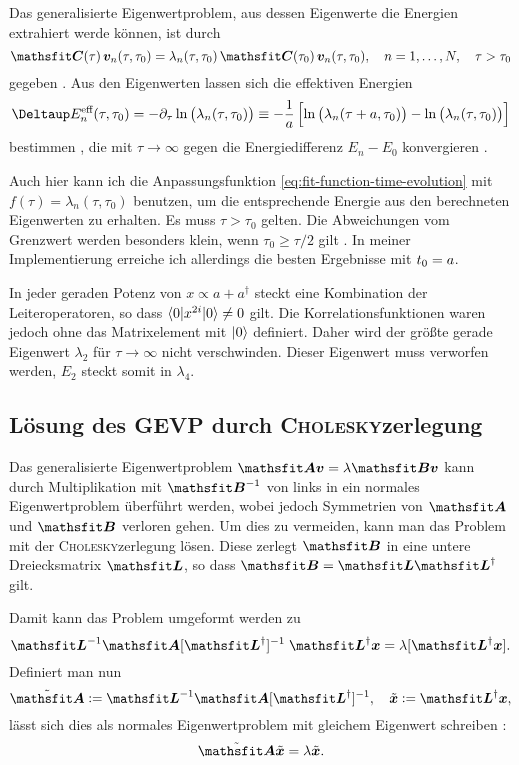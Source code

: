 Das generalisierte Eigenwertproblem, aus dessen Eigenwerte die Energien
extrahiert werde können, ist durch
\[
    \tens C(\tau) \, \vec v_n(\tau, \tau_0) = \lambda_n(\tau, \tau_0) \, \tens
    C(\tau_0) \, \vec v_n(\tau, \tau_0)
    \eqnsep
    n = 1, \ldots, N
    \eqnsep
    \tau > \tau_0
\]
gegeben \parencite[(2.1)]{Blossier/Eigenvalue}. Aus den Eigenwerten lassen sich
die effektiven Energien
\[
    \Deltaup E_n^\text{eff}(\tau, \tau_0) = - \partial_\tau \ln\del{\lambda_n(\tau, \tau_0)} \equiv -
    \frac 1\timestep \sbr{ \ln\del{\lambda_n(\tau+\timestep, \tau_0)} -
    \ln\del{\lambda_n(\tau, \tau_0)} }
\]
bestimmen \parencite[(2.4)]{Blossier/Eigenvalue}, die mit $\tau \to \infty$
gegen die Energiedifferenz $E_n - E_0$ konvergieren
\parencite[(2.3)]{Blossier/Eigenvalue}.

Auch hier kann ich die Anpassungsfunktion
\eqref{eq:fit-function-time-evolution} mit $f(\tau) = \lambda_n(\tau, \tau_0)$
benutzen, um die entsprechende Energie aus den berechneten Eigenwerten zu
erhalten. Es muss $\tau > \tau_0$ gelten. Die Abweichungen vom Grenzwert werden
besonders klein, wenn $\tau_0 \geq \tau/2$ gilt
\parencite[5]{Blossier/Eigenvalue}. In meiner Implementierung erreiche ich
allerdings die besten Ergebnisse mit $t_0 = a$.

In jeder geraden Potenz von $x \propto a + a^\dagger$ steckt eine Kombination
der Leiteroperatoren, so dass $\braket{0 | x^{2i} | 0} \neq 0$ gilt. Die
Korrelationsfunktionen waren jedoch ohne das Matrixelement mit $\ket 0$
definiert. Daher wird der größte gerade Eigenwert $\lambda_2$ für $\tau \to
\infty$ nicht verschwinden. Dieser Eigenwert muss verworfen werden, $E_2$
steckt somit in $\lambda_4$.

\subsection{Lösung des GEVP durch \textsc{Cholesky}zerlegung}

Das generalisierte Eigenwertproblem $\tens A \vec v = \lambda \tens B \vec v$
kann durch Multiplikation mit $\tens B^{-1}$ von links in ein normales
Eigenwertproblem überführt werden, wobei jedoch Symmetrien von $\tens A$ und
$\tens B$ verloren gehen. Um dies zu vermeiden, kann man das Problem mit der
\textsc{Cholesky}zerlegung lösen. Diese zerlegt $\tens B$ in eine untere
Dreiecksmatrix $\tens L$, so dass $\tens B = \tens L \tens L^\dagger$ gilt.
\parencite{MacKinnon/GEVP}

Damit kann das Problem umgeformt werden zu \parencite[(3.31)]{MacKinnon/GEVP}
\[
    \tens L^{-1} \tens A [\tens L^\dagger]^{-1} \; \tens L^\dagger \vec x
    =
    \lambda [\tens L^\dagger \vec x].
\]
Definiert man nun
\[
    \tilde{\tens A} := \tens L^{-1} \tens A [\tens L^\dagger]^{-1}
    \eqnsep
    \tilde{\vec x} := \tens L^\dagger \vec x,
\]
lässt sich dies als normales Eigenwertproblem mit gleichem Eigenwert schreiben
\parencite[(3.32)]{MacKinnon/GEVP}:
\[
    \tilde{\tens A} \tilde{\vec x} = \lambda \tilde{\vec x}.
\]

